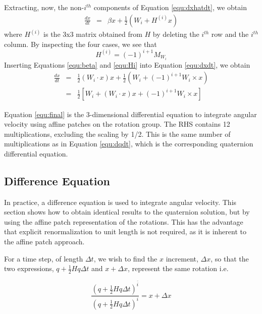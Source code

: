 \documentclass{gen-j-l}
\theoremstyle{definition}
\theoremstyle{remark}
\numberwithin{equation}{section}
\begin{document}
Extracting, now, the non-$i^{th}$ components of Equation \ref{equ:dxhatdt}, we obtain
\begin{eqnarray}
\label{equ:dxdt}
\frac{dx}{dt} & = & \beta x + \frac{1}{2} \left(  W_i +  H^{(i)} x  \right)
\end{eqnarray}
where $H^{(i)}$ is the 3x3 matrix obtained from $H$ by deleting the $i^{th}$ row
and the $i^{th}$ column.  By inspecting the four cases, we see that
\begin{equation}
\label{equ:Hi}
H^{(i)} = (-1)^{i+1} M_{W_i}
\end{equation}
Inserting Equations \ref{equ:beta} and \ref{equ:Hi} into Equation \ref{equ:dxdt}, we
obtain
\begin{eqnarray}
 \frac{dx}{dt} & = & 
\frac{1}{2} (W_i \cdot x) x + \frac{1}{2} \left(  W_i +   (-1)^{i+1} W_i \times x \right)  \nonumber \\
                     & = & \frac{1}{2} \left[  W_i +  (W_i \cdot x) x + (-1)^{i+1} W_i \times x \right] 
\label{equ:final}
\end{eqnarray}


Equation \ref{equ:final} is the 3-dimensional differential equation to integrate angular
velocity using affine patches on the rotation group.
 The RHS contains 12 multiplications, excluding the scaling by 1/2.  This is
the same number of multiplications as in Equation \ref{equ:dqdt}, which is the 
corresponding quaternion differential equation.

\subsection{Difference Equation}

In practice, a difference equation is used to integrate
angular velocity.  This section shows how to obtain
identical results to the quaternion solution, but by using
the affine patch representation of the rotations.  This has 
the advantage that explicit renormalization to unit length is not required,
as it is inherent to the affine patch approach.

For a time step, of length $\Delta t$, we wish to find
the $x$ increment, $\Delta x$, so that the two expressions,
$q + \frac{1}{2}Hq\Delta t$ and $x + \Delta x$,
represent the same rotation i.e.

\begin{equation*}
\frac{ (q + \frac{1}{2}Hq\Delta t) ^{\bar i} }
     { (q + \frac{1}{2}Hq\Delta t) ^i  } = 
x + \Delta x
\end{equation*}
\end{document}
